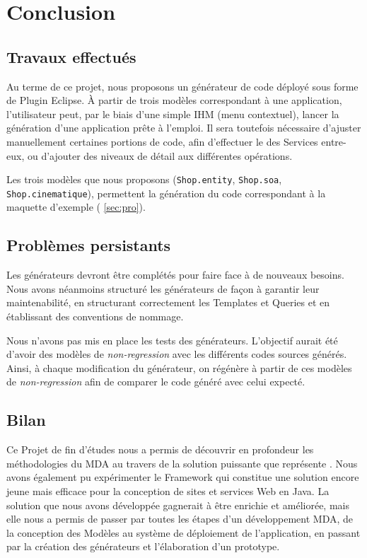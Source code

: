 \chapter{Conclusion}\label{chap:COnc}


\section{Travaux effectués}

Au terme de ce projet, nous proposons un générateur de code déployé sous forme de Plugin Eclipse. À partir de trois modèles correspondant à une application, l'utilisateur peut, par le biais d'une simple IHM (menu contextuel), lancer la génération d'une application \kwplay prête à l'emploi. Il sera toutefois nécessaire d'ajuster manuellement certaines portions de code, afin d'effectuer le  des Services entre-eux, ou d'ajouter des niveaux de détail aux différentes opérations.

Les trois modèles que nous proposons (\verb+Shop.entity+, \verb+Shop.soa+, \verb+Shop.cinematique+), permettent la génération du code correspondant à la maquette d'exemple (\cf{} \ref{sec:pro}).

\section{Problèmes persistants}

Les générateurs devront être complétés pour faire face à de nouveaux besoins. Nous avons néanmoins structuré les générateurs de façon à garantir leur maintenabilité, en structurant correctement les Templates et Queries et en établissant des conventions de nommage.


Nous n'avons pas mis en place les tests des générateurs. L'objectif aurait été d'avoir des modèles de \emph{non-regression} avec les différents codes sources générés. Ainsi, à chaque modification du générateur, on régénère à partir de ces modèles de \emph{non-regression} afin de comparer le code généré avec celui expecté.

\section{}

\section{Bilan}

Ce Projet de fin d'études nous a permis de découvrir en profondeur les méthodologies du MDA au travers de la solution puissante que représente \kwacceleo. Nous avons également pu expérimenter le Framework \kwplay qui constitue une solution encore jeune mais efficace pour la conception de sites et services Web en Java. La solution que nous avons développée gagnerait à être enrichie et améliorée, mais elle nous a permis de passer par toutes les étapes d'un développement MDA, de la conception des Modèles au système de déploiement de l'application, en passant par la création des générateurs et l'élaboration d'un prototype.

